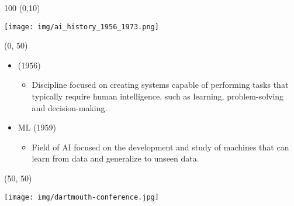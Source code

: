 \begin{frame}
  \begin{textblock}{100} (0,10)
    \begin{center}
      \texttt{[image: img/ai\_history\_1956\_1973.png]}
    \end{center}
  \end{textblock}

  \begin{textblock}{50}(0, 50)
    \begin{itemize}
      \item {} (1956)
        \begin{itemize}
        \item \footnotesize Discipline focused on creating systems capable of performing tasks that typically require human intelligence, such as learning, problem-solving and decision-making.
        \end{itemize}
      \item<2-> \acl{ML} (1959)
        \begin{itemize}
        \item \footnotesize Field of AI focused on the development and study of machines that can learn from data and generalize to unseen data.
        \end{itemize}
      \end{itemize}
    \end{textblock}

    \begin{textblock}{50}(50, 50)
      \begin{center}
        \texttt{[image: img/dartmouth-conference.jpg]}
      \end{center}
    \end{textblock}

\end{frame}


